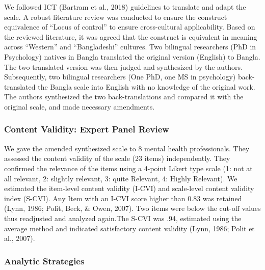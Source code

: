 \documentclass[
  man]{apa6}
\begin{document}
We followed ICT (Bartram et al., 2018) guidelines to translate and adapt the scale. A robust literature review was conducted to ensure the construct equivalence of ``Locus of control'' to ensure cross-cultural applicability. Based on the reviewed literature, it was agreed that the construct is equivalent in meaning across ``Western'' and ``Bangladeshi'' cultures. Two bilingual researchers (PhD in Psychology) natives in Bangla translated the original version (English) to Bangla. The two translated version was then judged and synthesized by the authors. Subsequently, two bilingual researchers (One PhD, one MS in psychology) back-translated the Bangla scale into English with no knowledge of the original work. The authors synthesized the two back-translations and compared it with the original scale, and made necessary amendments.

\hypertarget{content-validity-expert-panel-review}{%
\subsubsection{Content Validity: Expert Panel Review}\label{content-validity-expert-panel-review}}

We gave the amended synthesized scale to 8 mental health professionals. They assessed the content validity of the scale (23 items) independently. They confirmed the relevance of the items using a 4-point Likert type scale (1: not at all relevant, 2: slightly relevant, 3: quite Relevant, 4: Highly Relevant). We estimated the item-level content validity (I-CVI) and scale-level content validity index (S-CVI). Any Item with an I-CVI score higher than 0.83 was retained (Lynn, 1986; Polit, Beck, \& Owen, 2007). Two items were below the cut-off values thus readjusted and analyzed again.The S-CVI was .94, estimated using the average method and indicated satisfactory content validity (Lynn, 1986; Polit et al., 2007).

\hypertarget{analytic-strategies}{%
\subsubsection{Analytic Strategies}\label{analytic-strategies}}
\end{document}
